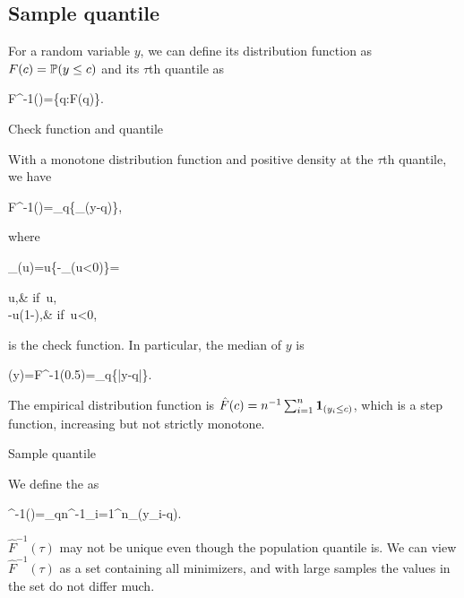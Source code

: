 \documentclass[10pt,a4paper]{book}
\begin{document}
\subsection{Sample quantile}\label{sec:sample_qt}
For a random variable $y$, we can define its distribution function as $F(c)=\mathbb P(y\leq c)$ and its $\tau$th quantile as 
\begin{sequation*}
	F^{-1}(\tau)=\inf\{q:F(q)\geq \tau\}.
\end{sequation*}  
\begin{thmbox}{Check function and quantile}
	\begin{proposition}\label{prop:check_function_qt}
		With a monotone distribution function and positive density at the $\tau$th quantile, we have  
		\begin{sequation}\label{eq:qt}
			F^{-1}(\tau)=\arg\min_{q\in\bbR}\bbE\left\{\rho_{\tau}(y-q)\right\},
		\end{sequation}
		where 
		\begin{sequation*}
			\rho_\tau(u)=u\left\{\tau-\1_{(u<0)}\right\}=\begin{cases}
				u\tau,& if\ u,\\
				-u(1-\tau),& if\ u<0,
			\end{cases}
		\end{sequation*}
		is the check function. In particular, the median of $y$ is  
		\begin{sequation*}
			(y)=F^{-1}(0.5)=_{q\in{}}\bbE\left\{|y-q|\right\}.
		\end{sequation*}
	\end{proposition}
\end{thmbox}

The empirical distribution function is $\hat{F}(c)=n^{-1}\sum_{i=1}^{n}{\boldsymbol 1}_{(y_i\leq c)}$, which is a step function,
increasing but not strictly monotone.
\begin{defbox}{Sample quantile}
	\begin{definition}\label{def:sample_qt}
		We define the  as 
		\begin{sequation}\label{eq:sample_qt}
			^{-1}(\tau)=\arg\min_{q\in{}}n^{-1}\sum_{i=1}^n\rho_\tau(y_i-q).
		\end{sequation}
	\end{definition}
\end{defbox}
$\hat{F}^{-1}(\tau)$ may not be unique even though the population quantile is. We can view $\hat{F}^{-1}(\tau)$ as a set containing all minimizers, and with large samples the values in the set do not differ much.
\end{document}
